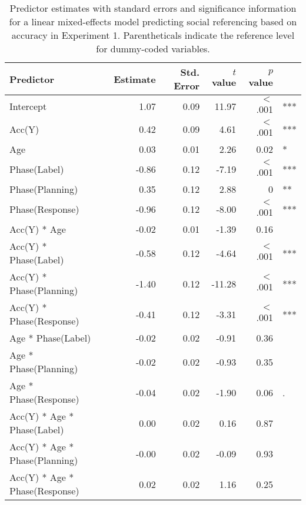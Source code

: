 \documentclass[english,man]{apa6}
\theoremstyle{definition}
\theoremstyle{definition}
\theoremstyle{definition}
\theoremstyle{remark}
\begin{document}
\begin{table}[b]
\centering
\caption{Predictor estimates with standard errors and significance information for a linear mixed-effects model predicting social referencing based on accuracy in Experiment 1. Parentheticals indicate the reference level for dummy-coded variables.} 
\label{tab:exp2acc_reg}
\begin{tabular}{lrrrrl}
 Predictor & Estimate & Std. Error & $t$ value & $p$ value &  \\ 
  \hline
Intercept & 1.07 & 0.09 & 11.97 & $<$ .001 & *** \\ 
  Acc(Y) & 0.42 & 0.09 & 4.61 & $<$ .001 & *** \\ 
  Age & 0.03 & 0.01 & 2.26 & 0.02 & * \\ 
  Phase(Label) & -0.86 & 0.12 & -7.19 & $<$ .001 & *** \\ 
  Phase(Planning) & 0.35 & 0.12 & 2.88 & 0 & ** \\ 
  Phase(Response) & -0.96 & 0.12 & -8.00 & $<$ .001 & *** \\ 
  Acc(Y) * Age & -0.02 & 0.01 & -1.39 & 0.16 &  \\ 
  Acc(Y) * Phase(Label) & -0.58 & 0.12 & -4.64 & $<$ .001 & *** \\ 
  Acc(Y) * Phase(Planning) & -1.40 & 0.12 & -11.28 & $<$ .001 & *** \\ 
  Acc(Y) * Phase(Response) & -0.41 & 0.12 & -3.31 & $<$ .001 & *** \\ 
  Age * Phase(Label) & -0.02 & 0.02 & -0.91 & 0.36 &  \\ 
  Age * Phase(Planning) & -0.02 & 0.02 & -0.93 & 0.35 &  \\ 
  Age * Phase(Response) & -0.04 & 0.02 & -1.90 & 0.06 & . \\ 
  Acc(Y) * Age * Phase(Label) & 0.00 & 0.02 & 0.16 & 0.87 &  \\ 
  Acc(Y) * Age * Phase(Planning) & -0.00 & 0.02 & -0.09 & 0.93 &  \\ 
  Acc(Y) * Age * Phase(Response) & 0.02 & 0.02 & 1.16 & 0.25 &  \\ 
   \hline
\end{tabular}
\end{table}
\end{document}
